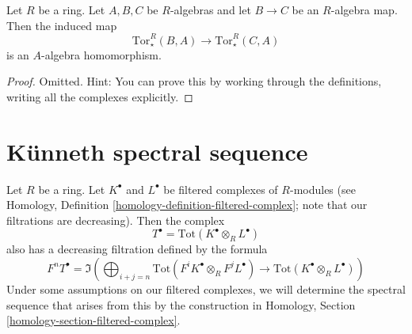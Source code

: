 \begin{lemma}
\label{lemma-functoriality-product-tor}
Let $R$ be a ring. Let $A, B, C$ be $R$-algebras and let $B \to C$ be an
$R$-algebra map. Then the induced map
$$
\text{Tor}^R_{\star}(B, A)
\longrightarrow
\text{Tor}^R_{\star}(C, A)
$$
is an $A$-algebra homomorphism.
\end{lemma}

\begin{proof}
Omitted. Hint: You can prove this by working through the definitions,
writing all the complexes explicitly.
\end{proof}








\section{K\"unneth spectral sequence}
\label{section-kunneth-spectral-sequence}

\noindent
Let $R$ be a ring. Let $K^\bullet$ and $L^\bullet$ be filtered complexes
of $R$-modules (see
Homology, Definition \ref{homology-definition-filtered-complex}; note that
our filtrations are decreasing). Then the complex
$$
T^\bullet = \text{Tot}(K^\bullet \otimes_R L^\bullet)
$$
also has a decreasing filtration defined by the formula
$$
F^nT^\bullet =
\Im\left(
\bigoplus\nolimits_{i + j = n}
\text{Tot}(F^iK^\bullet \otimes_R F^jL^\bullet) \to
\text{Tot}(K^\bullet \otimes_R L^\bullet)
\right)
$$
Under some assumptions on our filtered complexes, we will determine the
spectral sequence that arises from this by the construction in
Homology, Section \ref{homology-section-filtered-complex}.

